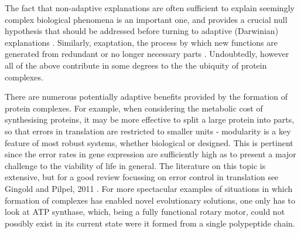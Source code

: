 \documentclass[a4paper,11pt,twoside,openright]{scrbook}
\begin{document}
The fact that non-adaptive explanations are often sufficient to explain seemingly complex biological phenomena is an important one, and provides a crucial null hypothesis that should be addressed before turning to adaptive (Darwinian) explanations \cite{Koonin2016}. Similarly, exaptation, the process by which new functions are generated from redundant or no longer necessary parts \cite{Gould1979}. Undoubtedly, however all of the above contribute in some degrees to the the ubiquity of protein complexes.

There are numerous potentially adaptive benefits provided by the formation of protein complexes. For example, when considering the metabolic cost of synthesising proteins, it may be more effective to split a large protein into parts, so that errors in translation are restricted to smaller units - modularity is a key feature of most robust systems, whether biological or designed. This is pertinent since the error rates in gene expression are sufficiently high as to present a major challenge to the viability of life in general. The literature on this topic is extensive, but for a good review focussing on error control in translation see Gingold and Pilpel, 2011 \cite{Gingold2011}. For more spectacular examples of situations in which formation of complexes has enabled novel evolutionary solutions, one only has to look at ATP synthase, which, being a fully functional rotary motor, could not possibly exist in its current state were it formed from a single polypeptide chain.
\end{document}
